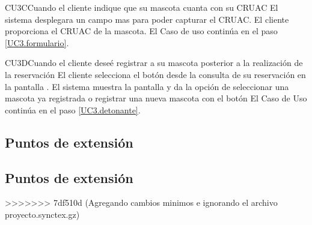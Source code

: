 \begin{UCtrayectoriaA}{CU3}{C}{Cuando el cliente indique que su mascota cuanta con su CRUAC}
	\UCpaso [\UCsist]El sistema desplegara un campo mas para poder capturar el CRUAC.
	\UCpaso [\UCactor]El cliente proporciona el CRUAC de la mascota.
	\UCpaso[] El Caso de uso continúa en el paso \ref{UC3.formulario}.
\end{UCtrayectoriaA}


\begin{UCtrayectoriaA}{CU3}{D}{Cuando el cliente deseé registrar a su mascota posterior a la realización de la reservación}
	\UCpaso[\UCactor] El cliente selecciona  el botón  desde la consulta de su reservación en la pantalla .
	\UCpaso [\UCsist] El sistema muestra la pantalla   y da la opción de seleccionar una mascota ya registrada o registrar una nueva mascota con el botón 
	\UCpaso[] El Caso de Uso continúa en el paso \ref{UC3.detonante}.
\end{UCtrayectoriaA}



\subsection{Puntos de extensión}

\subsection{Puntos de extensión}




>>>>>>> 7df510d (Agregando cambios minimos e ignorando el archivo proyecto.synctex.gz)
